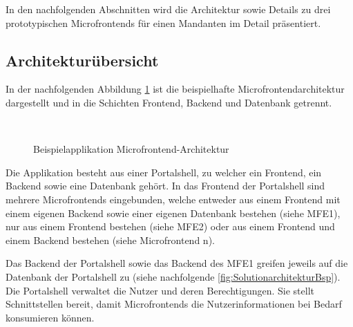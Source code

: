In den nachfolgenden Abschnitten wird die Architektur sowie Details zu drei prototypischen Microfrontends für einen Mandanten im Detail präsentiert.

\subsection{Architekturübersicht}\label{sec:PrototypArchitekturdiagramm}

In der nachfolgenden Abbildung \cref{fig:ArchitekturBsp} ist die beispielhafte Microfrontendarchitektur dargestellt und in die Schichten Frontend, Backend und Datenbank getrennt. 

\begin{figure}[hbt!]
	\centering
	\begin{minipage}[t]{0.8\textwidth}	
		\caption{Beispielapplikation Microfrontend-Architektur}
		\\ %
		\label{fig:ArchitekturBsp}
	\end{minipage}
\end{figure}

Die Applikation besteht aus einer Portalshell, zu welcher ein Frontend, ein Backend sowie eine Datenbank gehört. In das Frontend der Portalshell sind mehrere Microfrontends eingebunden, welche entweder aus einem Frontend mit einem eigenen Backend sowie einer eigenen Datenbank bestehen (siehe \gls{MFE1}), nur aus einem Frontend bestehen (siehe \gls{MFE2}) oder aus einem Frontend und einem Backend bestehen (siehe Microfrontend n).

Das Backend der Portalshell sowie das Backend des \gls{MFE1} greifen jeweils auf die Datenbank der Portalshell zu (siehe nachfolgende \cref{fig:SolutionarchitekturBsp}). Die Portalshell verwaltet die Nutzer und deren Berechtigungen. Sie stellt Schnittstellen bereit, damit Microfrontends die Nutzerinformationen bei Bedarf konsumieren können.

